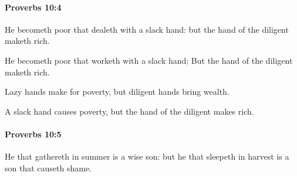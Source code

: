 		\paragraph{Proverbs 10:4} %
			\label{PROVERBS-10-4}

			He becometh poor that dealeth with a slack hand: but the hand of the diligent maketh rich.

			\begin{versebox}
					\item[BHS] 
					\item[ASV] He becometh poor that worketh with a slack hand; But the hand of the diligent maketh rich.
					\item[NIV] Lazy hands make for poverty, but diligent hands bring wealth.
					\item[NRSV] A slack hand causes poverty, but the hand of the diligent makes rich.
			\end{versebox}

		\paragraph{Proverbs 10:5} %
			\label{PROVERBS-10-5}

			He that gathereth in summer is a wise son: but he that sleepeth in harvest is a son that causeth shame.

